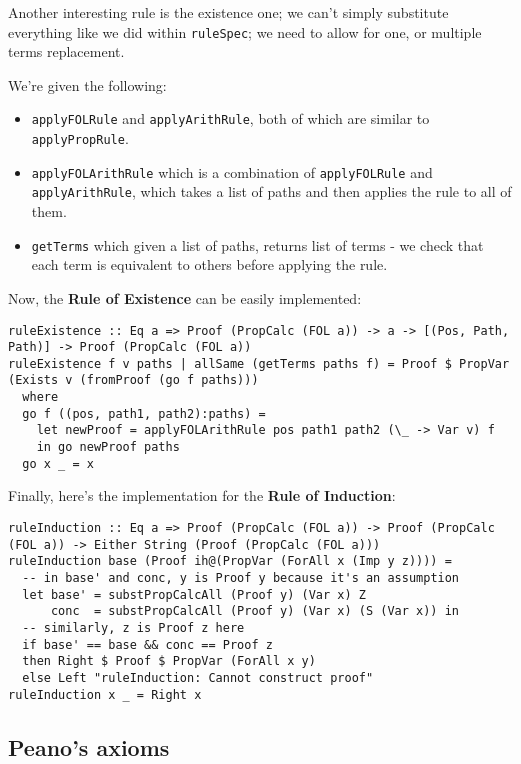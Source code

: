 \documentclass{article}
\begin{document}
Another interesting rule is the existence one; we can't simply substitute everything like we did within \texttt{ruleSpec}; we need to allow for one, or multiple terms replacement.

We're given the following:

\begin{itemize}
\item \texttt{applyFOLRule} and \texttt{applyArithRule}, both of which are similar to \texttt{applyPropRule}.
\item \texttt{applyFOLArithRule} which is a combination of \texttt{applyFOLRule} and \texttt{applyArithRule}, which takes a list of paths and then applies the rule to all of them.
\item \texttt{getTerms} which given a list of paths, returns list of terms - we check that each term is equivalent to others before applying the rule.
\end{itemize}

Now, the \textbf{Rule of Existence} can be easily implemented:

\begin{lstlisting}
ruleExistence :: Eq a => Proof (PropCalc (FOL a)) -> a -> [(Pos, Path, Path)] -> Proof (PropCalc (FOL a))
ruleExistence f v paths | allSame (getTerms paths f) = Proof $ PropVar (Exists v (fromProof (go f paths)))
  where
  go f ((pos, path1, path2):paths) =
    let newProof = applyFOLArithRule pos path1 path2 (\_ -> Var v) f
    in go newProof paths
  go x _ = x
\end{lstlisting}

Finally, here's the implementation for the \textbf{Rule of Induction}:

\begin{lstlisting}
ruleInduction :: Eq a => Proof (PropCalc (FOL a)) -> Proof (PropCalc (FOL a)) -> Either String (Proof (PropCalc (FOL a)))
ruleInduction base (Proof ih@(PropVar (ForAll x (Imp y z)))) =
  -- in base' and conc, y is Proof y because it's an assumption
  let base' = substPropCalcAll (Proof y) (Var x) Z
      conc  = substPropCalcAll (Proof y) (Var x) (S (Var x)) in
  -- similarly, z is Proof z here
  if base' == base && conc == Proof z
  then Right $ Proof $ PropVar (ForAll x y)
  else Left "ruleInduction: Cannot construct proof"
ruleInduction x _ = Right x
\end{lstlisting}

\subsection{Peano's axioms}
\end{document}

